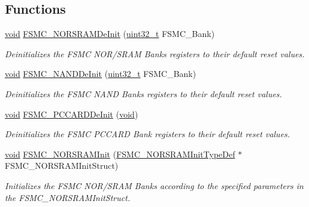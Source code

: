 \subsection*{Functions}
\begin{DoxyCompactItemize}
\item 
\hyperlink{usb__devapi_8h_afabf60e7f57651d6d595a02c75f07cd0}{void} \hyperlink{group___f_s_m_c___private___functions_gaab3e6648e8a584e73785361ac960eded}{F\+S\+M\+C\+\_\+\+N\+O\+R\+S\+R\+A\+M\+De\+Init} (\hyperlink{_p_e___types_8h_a33594304e786b158f3fb30289278f5af}{uint32\+\_\+t} F\+S\+M\+C\+\_\+\+Bank)
\begin{DoxyCompactList}\small\item\em Deinitializes the F\+S\+MC N\+O\+R/\+S\+R\+AM Banks registers to their default reset values. \end{DoxyCompactList}\item 
\hyperlink{usb__devapi_8h_afabf60e7f57651d6d595a02c75f07cd0}{void} \hyperlink{group___f_s_m_c___private___functions_gafb749503293474a68555961bd8f120e1}{F\+S\+M\+C\+\_\+\+N\+A\+N\+D\+De\+Init} (\hyperlink{_p_e___types_8h_a33594304e786b158f3fb30289278f5af}{uint32\+\_\+t} F\+S\+M\+C\+\_\+\+Bank)
\begin{DoxyCompactList}\small\item\em Deinitializes the F\+S\+MC N\+A\+ND Banks registers to their default reset values. \end{DoxyCompactList}\item 
\hyperlink{usb__devapi_8h_afabf60e7f57651d6d595a02c75f07cd0}{void} \hyperlink{group___f_s_m_c___private___functions_ga2f53ccf3a4f3c80a5a56fb47ccd47ccd}{F\+S\+M\+C\+\_\+\+P\+C\+C\+A\+R\+D\+De\+Init} (\hyperlink{usb__devapi_8h_afabf60e7f57651d6d595a02c75f07cd0}{void})
\begin{DoxyCompactList}\small\item\em Deinitializes the F\+S\+MC P\+C\+C\+A\+RD Bank registers to their default reset values. \end{DoxyCompactList}\item 
\hyperlink{usb__devapi_8h_afabf60e7f57651d6d595a02c75f07cd0}{void} \hyperlink{group___f_s_m_c___private___functions_ga9c27816e8b17394c9ee1ce9298917b4a}{F\+S\+M\+C\+\_\+\+N\+O\+R\+S\+R\+A\+M\+Init} (\hyperlink{struct_f_s_m_c___n_o_r_s_r_a_m_init_type_def}{F\+S\+M\+C\+\_\+\+N\+O\+R\+S\+R\+A\+M\+Init\+Type\+Def} $\ast$F\+S\+M\+C\+\_\+\+N\+O\+R\+S\+R\+A\+M\+Init\+Struct)
\begin{DoxyCompactList}\small\item\em Initializes the F\+S\+MC N\+O\+R/\+S\+R\+AM Banks according to the specified parameters in the F\+S\+M\+C\+\_\+\+N\+O\+R\+S\+R\+A\+M\+Init\+Struct. \end{DoxyCompactList}\item 

\end{DoxyCompactItemize}
